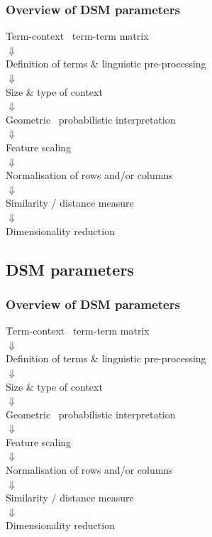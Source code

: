 \documentclass[t]{beamer} %
\begin{document}
\begin{frame}
  \frametitle{Overview of DSM parameters}

  \ungap[1]
  \begin{center}
    Term-context \vs\ term-term matrix\\
    \pause $\Downarrow$\\
    Definition of terms \& linguistic pre-processing\\
    \pause $\Downarrow$\\
    Size \& type of context\\
    \pause $\Downarrow$\\
    Geometric \vs\ probabilistic interpretation\\
    \pause $\Downarrow$\\
    Feature scaling\\
    \pause $\Downarrow$\\
    Normalisation of rows and/or columns\\
    \pause $\Downarrow$\\
    Similarity / distance measure\\
    \pause $\Downarrow$\\
    Dimensionality reduction
  \end{center}
\end{frame}

\subsection{DSM parameters}

\begin{frame}
  \frametitle{Overview of DSM parameters}

  \ungap[1]
  \begin{center}
    \h{Term-context \vs\ term-term matrix}\\
    $\Downarrow$\\
    Definition of terms \& linguistic pre-processing\\
    $\Downarrow$\\
    Size \& type of context\\
    $\Downarrow$\\
    Geometric \vs\ probabilistic interpretation\\
    $\Downarrow$\\
    Feature scaling\\
    $\Downarrow$\\
    Normalisation of rows and/or columns\\
    $\Downarrow$\\
    Similarity / distance measure\\
    $\Downarrow$\\
    Dimensionality reduction
  \end{center}
\end{frame}
\end{document}
